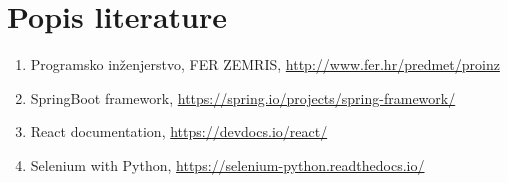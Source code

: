 \chapter*{Popis literature}
	 	
	
		
		
		\begin{enumerate}
			
			
			\item	Programsko inženjerstvo, FER ZEMRIS, \url{http://www.fer.hr/predmet/proinz}
			
			\item	SpringBoot framework, \url{https://spring.io/projects/spring-framework/}
			
			\item 	React documentation, \url{https://devdocs.io/react/}
			
			\item 	Selenium with Python, \url{https://selenium-python.readthedocs.io/}
			
		\end{enumerate}
		
		 